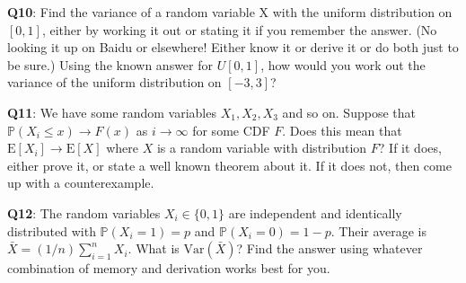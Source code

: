 \documentclass[]{article}
\begin{document}
\textbf{Q10}: Find the variance of a random variable X with the uniform
distribution on \([0, 1]\), either by working it out or stating it if
you remember the answer. (No looking it up on Baidu or elsewhere! Either
know it or derive it or do both just to be sure.) Using the known answer
for \(U[0, 1]\), how would you work out the variance of the uniform
distribution on \([-3, 3]\)?

\textbf{Q11}: We have some random variables \(X_1, X_2, X_3\) and so on.
Suppose that \(\mathbb{P}(X_i\le x)\to F(x)\) as \(i\to \infty\) for
some CDF \(F\). Does this mean that \(\mathrm{E}[X_i]\to \mathrm{E}[X]\)
where \(X\) is a random variable with distribution \(F\)? If it does,
either prove it, or state a well known theorem about it. If it does not,
then come up with a counterexample.

\textbf{Q12}: The random variables \(X_i\in\{0,1\}\) are independent and
identically distributed with \(\mathbb{P}(X_i = 1) = p\) and
\(\mathbb{P}(X_i = 0) = 1-p\). Their average is
\(\bar X = (1/n)\sum_{i=1}^n X_i\). What is \(\mathrm{Var}(\bar X)\)?
Find the answer using whatever combination of memory and derivation
works best for you.
\end{document}
